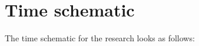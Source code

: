 \documentclass[12pt]{scrreprt}
\begin{document}
\section{Time schematic}
\label{Time schematic}

    

The time schematic for the research looks as follows:
\end{document}
